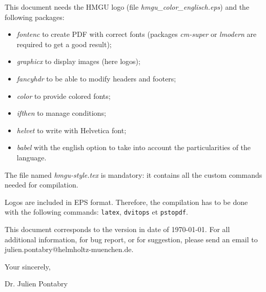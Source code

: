 \documentclass[a4paper,10pt,twosided]{letter}
\begin{document}
	\newparagraph

	This document needs the HMGU logo (file \textit{hmgu\_color\_englisch.eps}) and the following packages:
	\begin{itemize}
		\item \textit{fontenc} to create PDF with correct fonts (packages \textit{cm-super} or \textit{lmodern} are required to get a good result);
		\item \textit{graphicx} to display images (here logos);
		\item \textit{fancyhdr} to be able to modify headers and footers;
		\item \textit{color} to provide colored fonts;
		\item \textit{ifthen} to manage conditions;
		\item \textit{helvet} to write with Helvetica font;
		\item \textit{babel} with the english option to take into account the particularities of the language.
	\end{itemize}
	The file named \textit{hmgu-style.tex} is mandatory: it contains all the custom commands needed for compilation.

	\newparagraph

	Logos are included in EPS format. Therefore, the compilation has to be done with the following commands: \texttt{latex}, \texttt{dvitops} et \texttt{pstopdf}.

	\newparagraph

	This document corresponds to the version in date of \today. For all additional information, for bug report, or for suggestion, please send an email to julien.pontabry@helmholtz-muenchen.de.
	
	\newparagraph
	
	Your sincerely,

	\newpart

	Dr. Julien Pontabry
\end{document}
